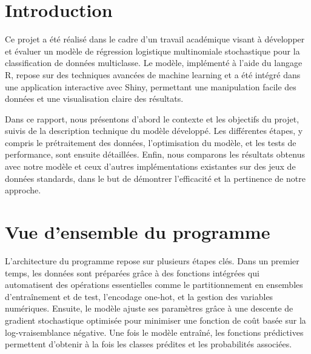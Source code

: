 \documentclass{rapport}
\begin{document}


        
\fairemarges %
\fairepagedegarde %
\tabledematieres %


\section*{Introduction}

Ce projet a été réalisé dans le cadre d'un travail académique visant à développer et évaluer un modèle de régression logistique multinomiale stochastique pour la classification de données multiclasse. Le modèle, implémenté à l'aide du langage R, repose sur des techniques avancées de machine learning et a été intégré dans une application interactive avec Shiny, permettant une manipulation facile des données et une visualisation claire des résultats.

Dans ce rapport, nous présentons d'abord le contexte et les objectifs du projet, suivis de la description technique du modèle développé. Les différentes étapes, y compris le prétraitement des données, l'optimisation du modèle, et les tests de performance, sont ensuite détaillées. Enfin, nous comparons les résultats obtenus avec notre modèle et ceux d'autres implémentations existantes sur des jeux de données standards, dans le but de démontrer l'efficacité et la pertinence de notre approche.


\section{Vue d'ensemble du programme}
L'architecture du programme repose sur plusieurs étapes clés. Dans un premier temps, les données sont préparées grâce à des fonctions intégrées qui automatisent des opérations essentielles comme le partitionnement en ensembles d’entraînement et de test, l’encodage one-hot, et la gestion des variables numériques. Ensuite, le modèle ajuste ses paramètres grâce à une descente de gradient stochastique optimisée pour minimiser une fonction de coût basée sur la log-vraisemblance négative. Une fois le modèle entraîné, les fonctions prédictives permettent d’obtenir à la fois les classes prédites et les probabilités associées.
\end{document}
